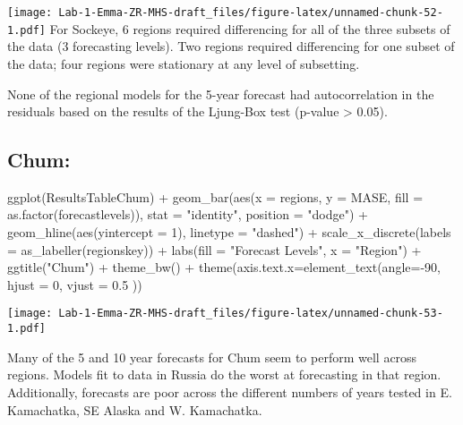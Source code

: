 \documentclass[
]{article}
\newenvironment{Shaded}{\begin{snugshade}}{\end{snugshade}}
\newcommand{\AttributeTok}[1]{\textcolor[rgb]{0.77,0.63,0.00}{#1}}
\newcommand{\DecValTok}[1]{\textcolor[rgb]{0.00,0.00,0.81}{#1}}
\newcommand{\FloatTok}[1]{\textcolor[rgb]{0.00,0.00,0.81}{#1}}
\newcommand{\FunctionTok}[1]{\textcolor[rgb]{0.00,0.00,0.00}{#1}}
\newcommand{\NormalTok}[1]{#1}
\newcommand{\SpecialCharTok}[1]{\textcolor[rgb]{0.00,0.00,0.00}{#1}}
\newcommand{\StringTok}[1]{\textcolor[rgb]{0.31,0.60,0.02}{#1}}
\begin{document}
\texttt{[image: Lab-1-Emma-ZR-MHS-draft\_files/figure-latex/unnamed-chunk-52-1.pdf]}
For Sockeye, 6 regions required differencing for all of the three
subsets of the data (3 forecasting levels). Two regions required
differencing for one subset of the data; four regions were stationary at
any level of subsetting.

None of the regional models for the 5-year forecast had autocorrelation
in the residuals based on the results of the Ljung-Box test (p-value
\textgreater{} 0.05).

\hypertarget{chum}{%
\subsection{Chum:}\label{chum}}

\begin{Shaded}
\begin{Highlighting}[]
\FunctionTok{ggplot}\NormalTok{(ResultsTableChum) }\SpecialCharTok{+} 
  \FunctionTok{geom\_bar}\NormalTok{(}\FunctionTok{aes}\NormalTok{(}\AttributeTok{x =}\NormalTok{ regions, }\AttributeTok{y =}\NormalTok{ MASE, }\AttributeTok{fill =} \FunctionTok{as.factor}\NormalTok{(forecastlevels)), }\AttributeTok{stat =} \StringTok{"identity"}\NormalTok{, }\AttributeTok{position =} \StringTok{"dodge"}\NormalTok{) }\SpecialCharTok{+} 
  \FunctionTok{geom\_hline}\NormalTok{(}\FunctionTok{aes}\NormalTok{(}\AttributeTok{yintercept =} \DecValTok{1}\NormalTok{), }\AttributeTok{linetype =} \StringTok{"dashed"}\NormalTok{) }\SpecialCharTok{+} 
  \FunctionTok{scale\_x\_discrete}\NormalTok{(}\AttributeTok{labels =} \FunctionTok{as\_labeller}\NormalTok{(regionskey)) }\SpecialCharTok{+}
  \FunctionTok{labs}\NormalTok{(}\AttributeTok{fill =} \StringTok{"Forecast Levels"}\NormalTok{, }\AttributeTok{x =} \StringTok{"Region"}\NormalTok{) }\SpecialCharTok{+} 
  \FunctionTok{ggtitle}\NormalTok{(}\StringTok{"Chum"}\NormalTok{) }\SpecialCharTok{+} \FunctionTok{theme\_bw}\NormalTok{() }\SpecialCharTok{+} \FunctionTok{theme}\NormalTok{(}\AttributeTok{axis.text.x=}\FunctionTok{element\_text}\NormalTok{(}\AttributeTok{angle=}\SpecialCharTok{{-}}\DecValTok{90}\NormalTok{, }\AttributeTok{hjust =} \DecValTok{0}\NormalTok{, }\AttributeTok{vjust =} \FloatTok{0.5}\NormalTok{ ))}
\end{Highlighting}
\end{Shaded}

\texttt{[image: Lab-1-Emma-ZR-MHS-draft\_files/figure-latex/unnamed-chunk-53-1.pdf]}

Many of the 5 and 10 year forecasts for Chum seem to perform well across
regions. Models fit to data in Russia do the worst at forecasting in
that region. Additionally, forecasts are poor across the different
numbers of years tested in E. Kamachatka, SE Alaska and W. Kamachatka.
\end{document}

